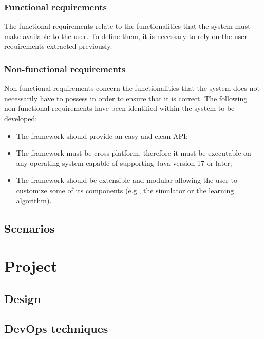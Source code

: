 \documentclass[12pt,a4paper,openright,twoside]{book}
\begin{document}
\subsection*{Functional requirements}
The functional requirements relate to the functionalities that the system must make available to the user. 
    To define them, it is necessary to rely on the user requirements extracted previously.

\subsection*{Non-functional requirements}
Non-functional requirements concern the functionalities that the system does not necessarily have to possess in order to ensure that it is correct.
The following non-functional requirements have been identified within the system to be developed:
\begin{itemize}
    \item The framework should provide an easy and clean API;
    \item The framework must be cross-platform, therefore it must be executable on any operating 
        system capable of supporting Java version 17 or later;
    \item The framework should be extensible and modular allowing the user to customize some of its 
        components (e.g., the simulator or the learning algorithm).
\end{itemize}

\section{Scenarios}

\chapter{Project} 
\label{chap:project}

\section{Design}

\section{DevOps techniques}
\end{document}
